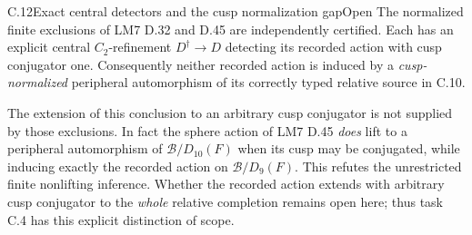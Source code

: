 \begin{statement}{C.12}{Exact central detectors and the cusp normalization gap}{Open}
The normalized finite exclusions of LM7 D.32 and D.45
are independently certified. Each has an explicit
central \(C_2\)-refinement \(D^\dagger\to D\) detecting
its recorded action with cusp conjugator one.
Consequently neither recorded action is induced by
a \emph{cusp-normalized} peripheral automorphism of
its correctly typed relative source in C.10.

The extension of this conclusion to an arbitrary
cusp conjugator is not supplied by those exclusions.
In fact the sphere action of LM7 D.45 \emph{does}
lift to a peripheral automorphism of
\(\mathcal B/D_{10}(F)\) when its cusp may be conjugated,
while inducing exactly the recorded action on
\(\mathcal B/D_9(F)\).
This refutes the unrestricted finite nonlifting
inference. Whether the recorded action extends
with arbitrary cusp conjugator to the \emph{whole}
relative completion remains open here; thus task
C.4 has this explicit distinction of scope.
\end{statement}
